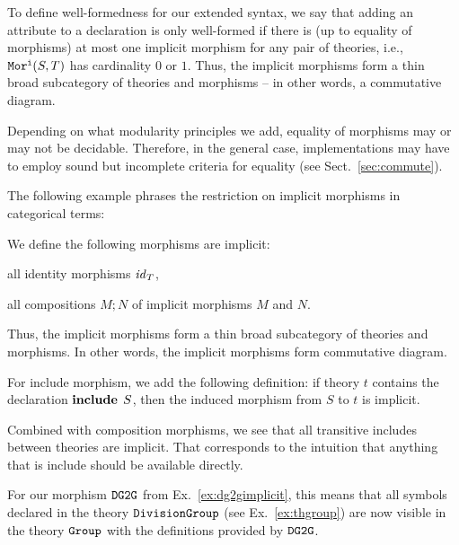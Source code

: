 To define well-formedness for our extended syntax, we say that adding an attribute to a declaration is only well-formed if there is (up to equality of morphisms) at most one implicit morphism for any pair of theories, i.e., $\mathtt{Mor^i}(S,T)$ has cardinality $0$ or $1$.
Thus, the implicit morphisms form a thin broad subcategory of theories and morphisms --
in other words, a commutative diagram.

\begin{modexp}
Depending on what modularity principles we add, equality of morphisms may or may not be decidable.
Therefore, in the general case, implementations may have to employ sound but incomplete criteria for equality (see Sect.~\ref{sec:commute}).
\end{modexp}

\begin{modexp}
The following example phrases the restriction on implicit morphisms in categorical terms:
\begin{example}\label{impl:cat}
We define the following morphisms are implicit:
\begin{compactitem}
 \item all identity morphisms $\mathit{id}_{T}$,
 \item all compositions $M;N$ of implicit morphisms $M$ and $N$.
\end{compactitem}
Thus, the implicit morphisms form a thin broad subcategory of theories and morphisms.
In other words, the implicit morphisms form commutative diagram.
\end{example}
\end{modexp}

\begin{example}\label{impl:incl}
For include morphism, we add the following definition: if theory $t$ contains the declaration $\operatorname{\mathbf{include}}{\;S}$, then the induced morphism from $S$ to $t$ is implicit.

Combined with composition morphisms, we see that all transitive includes between theories are implicit.
That corresponds to the intuition that anything that is include should be available directly.
\end{example}

\begin{example}
	For our morphism $\operatorname{\mathtt{DG2G}}$ from Ex.~\ref{ex:dg2gimplicit}, this means that all symbols declared in the theory $\operatorname{\mathtt{DivisionGroup}}$ (see Ex.~\ref{ex:thgroup}) are now visible in the theory $\operatorname{\mathtt{Group}}$ with the definitions provided by $\operatorname{\mathtt{DG2G}}$.
\end{example}

